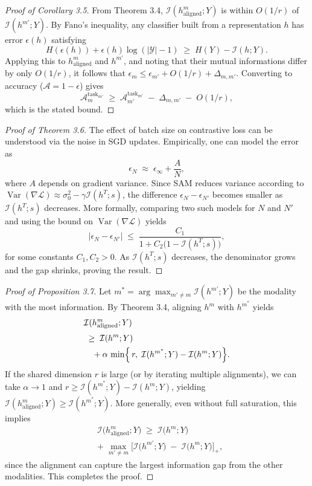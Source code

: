 \documentclass[letterpaper]{article} %
\theoremstyle{definition}                %
\theoremstyle{plain}                     %
\theoremstyle{remark}                    %
\DeclareMathOperator{\Var}{Var}
\begin{document}
\begin{proof}[Proof of Corollary 3.5]
From Theorem 3.4, $\mathcal{I}(h^m_{\mathrm{aligned}};Y)$ is within $O(1/r)$ of $\mathcal{I}(h^{m'};Y)$.  By Fano’s inequality, any classifier built from a representation $h$ has error $\epsilon(h)$ satisfying
\[
H(\epsilon(h)) + \epsilon(h)\log(|\mathcal{Y}|-1) \;\ge\; H(Y) - \mathcal{I}(h;Y).
\]
Applying this to $h^m_{\mathrm{aligned}}$ and $h^{m'}$, and noting that their mutual informations differ by only $O(1/r)$, it follows that $\epsilon_m \le \epsilon_{m'} + O(1/r) + \Delta_{m,m'}$.  Converting to accuracy ($\mathcal{A}=1-\epsilon$) gives 
\[
\mathcal{A}_m^{\mathrm{task}_{m'}} 
\;\ge\; \mathcal{A}_{m'}^{\mathrm{task}_{m'}} \;-\; \Delta_{m,m'} \;-\; O(1/r),
\]
which is the stated bound.
\end{proof}

\begin{proof}[Proof of Theorem 3.6]
The effect of batch size on contrastive loss can be understood via the noise in SGD updates.  Empirically, one can model the error as 
\[
\epsilon_N \;\approx\; \epsilon_\infty + \frac{A}{N},
\]
where $A$ depends on gradient variance.  Since SAM reduces variance according to $\Var(\nabla\mathcal{L})\approx \sigma_0^2-\gamma\mathcal{I}(h^T;s)$, the difference $\epsilon_N-\epsilon_{N'}$ becomes smaller as $\mathcal{I}(h^T;s)$ decreases.  More formally, comparing two such models for $N$ and $N'$ and using the bound on $\Var(\nabla\mathcal{L})$ yields
\[
|\epsilon_N - \epsilon_{N'}| \;\le\; \frac{C_1}{1 + C_2\bigl(1 - \mathcal{I}(h^T; s)\bigr)},
\]
for some constants $C_1,C_2>0$.  As $\mathcal{I}(h^T;s)$ decreases, the denominator grows and the gap shrinks, proving the result.
\end{proof}

\begin{proof}[Proof of Proposition 3.7]
Let $m^* = \arg\max_{m'\neq m}\mathcal{I}(h^{m'};Y)$ be the modality with the most information.  By Theorem 3.4, aligning $h^m$ with $h^{m^*}$ yields 
\[
\begin{alignedat}{1}
&\mathcal{I}(h^m_{\mathrm{aligned}};Y) \\[2pt]
&\;\ge\; \mathcal{I}(h^m;Y) \\ 
&\quad + \alpha\,\min\Bigl\{\,r,\; \mathcal{I}(h^{m^*};Y) - \mathcal{I}(h^m;Y)\Bigr\}.
\end{alignedat}
\]
If the shared dimension $r$ is large (or by iterating multiple alignments), we can take $\alpha\to1$ and $r\ge \mathcal{I}(h^{m^*};Y)-\mathcal{I}(h^m;Y)$, yielding 
$\mathcal{I}(h^m_{\mathrm{aligned}};Y)\ge \mathcal{I}(h^{m^*};Y)$.  More generally, even without full saturation, this implies
\[
\begin{aligned}
&\mathcal{I}\!\bigl(h^m_{\mathrm{aligned}};Y\bigr)
\;\ge\;\mathcal{I}\!\bigl(h^m;Y\bigr)
\\
&+\;\max_{m'\neq m}\bigl[\mathcal{I}\!\bigl(h^{m'};Y\bigr)\;-\;\mathcal{I}\!\bigl(h^m;Y\bigr)\bigr]_+,
\end{aligned}
\]
since the alignment can capture the largest information gap from the other modalities.  This completes the proof.
\end{proof}
\end{document}
